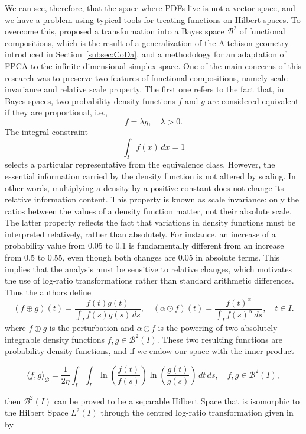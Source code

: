 \documentclass[
	12pt,				%
	oneside,			%
	a4paper,			%
	english,			%
	brazil				%
	]{abntex2ppgsi}
\begin{document}
We can see, therefore, that the space where PDFs live is not a vector space, and we have a problem using typical tools for treating functions on Hilbert spaces. To overcome this,  proposed a transformation into a Bayes space $\mathcal{B}^2$ of functional compositions, which is the result of a generalization of the Aitchison geometry introduced in Section~\ref{subsec:CoDa}, and a methodology for an adaptation of FPCA to the infinite dimensional simplex space. One of the main concerns of this research was to preserve two features of functional compositions, namely scale invariance and relative scale property. The first one refers to the fact that, in Bayes spaces, two probability density functions \( f \) and \( g \) are considered equivalent if they are proportional, i.e.,
\[
f = \lambda g, \quad \lambda > 0.
\]
The integral constraint
\[
\int_I f(x) \, dx = 1
\]
selects a particular representative from the equivalence class. However, the essential information carried by the density function is not altered by scaling. In other words, multiplying a density by a positive constant does not change its relative information content. This property is known as scale invariance: only the ratios between the values of a density function matter, not their absolute scale. %
The latter property reflects the fact that variations in density functions must be interpreted relatively, rather than absolutely. For instance, an increase of a probability value from 0.05 to 0.1 is fundamentally different from an increase from 0.5 to 0.55, even though both changes are 0.05 in absolute terms. This implies that the analysis must be sensitive to relative changes, which motivates the use of log-ratio transformations rather than standard arithmetic differences. Thus the authors define 
\[
(f \oplus g)(t) = \frac{f(t)g(t)}{\int_I f(s)g(s) \, ds}, \quad (\alpha \odot f)(t) = \frac{f(t)^\alpha}{\int_I f(s)^\alpha \, ds}, \quad t \in I.
\]
where $f \oplus g$ is the perturbation and $\alpha \odot f$ is the powering of two absolutely integrable density functions $f,g \in \mathcal{B}^2(I)$. These two resulting functions are probability density functions, and if we endow our space with the inner product    

\[
\langle f, g \rangle_{\mathcal{B}} = \frac{1}{2\eta} \int_I \int_I \ln\left( \frac{f(t)}{f(s)} \right) \ln\left( \frac{g(t)}{g(s)} \right) \, dt \, ds, \quad f, g \in \mathcal{B}^2(I),
\]

then $\mathcal{B}^2(I)$ can be proved to be a separable Hilbert Space that is isomorphic to the Hilbert Space $L^2(I)$ through the centred log-ratio transformation given in \cite{van2014bayes} by 
\end{document}
